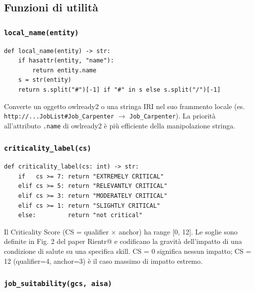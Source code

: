 \documentclass[a4paper,12pt]{article}
\begin{document}
\subsection{Funzioni di utilit\`{a}}

\subsubsection{\texttt{local\_name(entity)}}

\begin{lstlisting}[caption={Estrazione del nome locale da un IRI.}]
def local_name(entity) -> str:
    if hasattr(entity, "name"):
        return entity.name
    s = str(entity)
    return s.split("#")[-1] if "#" in s else s.split("/")[-1]
\end{lstlisting}

\noindent Converte un oggetto owlready2 o una stringa IRI nel suo frammento locale
(es. \texttt{http://...JobList\#Job\_\allowbreak{}Carpenter} $\rightarrow$
\texttt{Job\_Carpenter}). La priorit\`{a} all'attributo \texttt{.name}
di owlready2 \`{e} pi\`{u} efficiente della manipolazione stringa.

\subsubsection{\texttt{criticality\_label(cs)}}

\begin{lstlisting}[caption={Mappatura CS $\rightarrow$ etichetta (Fig. 2 del paper).}]
def criticality_label(cs: int) -> str:
    if   cs >= 7: return "EXTREMELY CRITICAL"
    elif cs >= 5: return "RELEVANTLY CRITICAL"
    elif cs >= 3: return "MODERATELY CRITICAL"
    elif cs >= 1: return "SLIGHTLY CRITICAL"
    else:         return "not critical"
\end{lstlisting}

\noindent Il Criticality Score (CS = qualifier $\times$ anchor) ha range [0, 12].
Le soglie sono definite in Fig. 2 del paper Rientr@ e codificano la
gravit\`{a} dell'impatto di una condizione di salute su una specifica
skill. CS = 0 significa nessun impatto; CS = 12 (qualifier=4, anchor=3)
\`{e} il caso massimo di impatto estremo.

\subsubsection{\texttt{job\_suitability(gcs, aisa)}}
\end{document}
